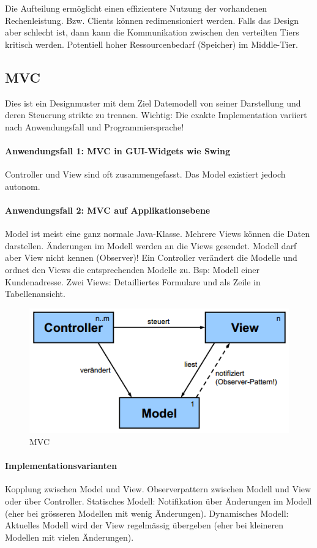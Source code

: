 Die Aufteilung ermöglicht einen effizientere Nutzung der vorhandenen Rechenleistung. Bzw. Clients können redimensioniert werden. Falls das Design aber schlecht ist, dann kann die Kommunikation zwischen den verteilten Tiers kritisch werden. Potentiell hoher Ressourcenbedarf (Speicher) im Middle-Tier.

\subsection{MVC}
Dies ist ein Designmuster mit dem Ziel Datemodell von seiner Darstellung und deren Steuerung strikte zu trennen. Wichtig: Die exakte Implementation variiert nach Anwendungsfall und Programmiersprache!

\paragraph{Anwendungsfall 1: MVC in GUI-Widgets wie Swing} Controller und View sind oft zusammengefasst. Das Model existiert jedoch autonom.

\paragraph{Anwendungsfall 2: MVC auf Applikationsebene} Model ist meist eine ganz normale Java-Klasse. Mehrere Views können die Daten darstellen. Änderungen im Modell werden an die Views gesendet. Modell darf aber View nicht kennen (Observer)! Ein Controller verändert die Modelle und ordnet den Views die entsprechenden Modelle zu. Bsp: Modell einer Kundenadresse. Zwei Views: Detailliertes Formulare und als Zeile in Tabellenansicht.

\begin{figure}[h!]
\centering
\includegraphics[width=0.7\linewidth]{fig/mvc}
\caption{MVC}
\label{fig:mvc}
\end{figure}

\paragraph{Implementationsvarianten} Kopplung zwischen Model und View. Observerpattern zwischen Modell und View oder über Controller. Statisches Modell: Notifikation über Änderungen im Modell (eher bei grösseren Modellen mit wenig Änderungen). Dynamisches Modell: Aktuelles Modell wird der View regelmässig übergeben (eher bei kleineren Modellen mit vielen Änderungen).

